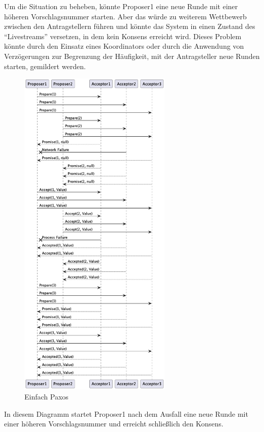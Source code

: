 Um die Situation zu beheben, könnte Proposer1 eine neue Runde mit einer höheren Vorschlagsnummer starten. Aber das würde zu weiterem Wettbewerb zwischen den Antragstellern führen und könnte das System in einen Zustand des \enquote{Livestreams} versetzen, in dem kein Konsens erreicht wird. Dieses Problem könnte durch den Einsatz eines Koordinators oder durch die Anwendung von Verzögerungen zur Begrenzung der Häufigkeit, mit der Antragsteller neue Runden starten, gemildert werden.

\begin{figure}[!ht]
  \centering
  \includegraphics[width=0.65\textwidth]{fig/uml/paxos-issue-solve}
  \caption{Einfach Paxos}
  \label{fig:simple-paxos-solve}
\end{figure}

In diesem Diagramm startet Proposer1 nach dem Ausfall eine neue Runde mit einer höheren Vorschlagsnummer und erreicht schließlich den Konsens.



